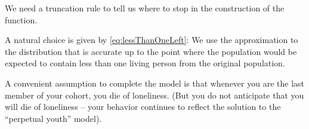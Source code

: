 \documentclass[\econtexRoot/BufferStockTheory.tex]{subfiles}
\begin{document}
We need a truncation rule to tell us where to stop in the construction of the function.

A natural choice is given by \eqref{eq:lessThanOneLeft}: We use the approximation to the distribution that is accurate up to the point where the population would be expected to contain less than one living person from the original population.

A convenient assumption to complete the model is that whenever you are the last member of your cohort, you die of loneliness.  (But you do not anticipate that you will die of loneliness -- your behavior continues to reflect the solution to the ``perpetual youth'' model).



\begin{comment}
  Since in practice we will only ever be simulating the model over a finite time horizon (call it $\tMax$, one option would be to select multiple of $\tMax$.  But as we are likely to be simulating thousands of periods, this would generate an analytical expression with thousands of terms which would likely be costly to evaluate.

  If we are simulating the population in addition to constructing a discrete Markov chain, a natural choice is to choose the number of terms $\tAbs$ in such a way that the population mass corresponding to the truncated portion of the series is ``small'' relative to the number of persons.


  However, the procedure for constructing an infinite horizon version of that approximation requires a slight modification of the method described above, which applies for any finite time interval.  The modification is that the probability mass associated with the unbounded portion of $\SetFullCnts$ needs to be redistributed to the bounded interval, while preserving the mean.


  The most natural choice is to redistribute the portion of the distribution that lives above $\Top{\SetPartCnts}_{\NumAprxStes}$ into $\SetPartCnts_{\NumAprxStes}$ and the portion that lives below $\Bot{\SetPartCnts}_{1}$ into $\SetPartCnts_{1}$.
\end{comment}
\end{document}
